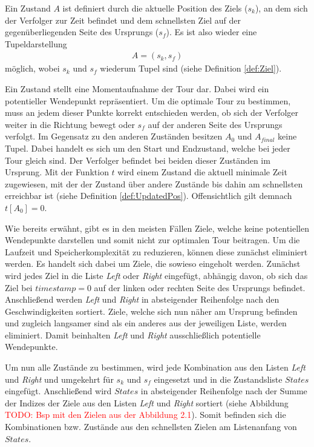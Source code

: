 \documentclass[german,version-2019-11]{uzl-thesis}
\begin{document}
\begin{definition}
Ein Zustand $A$ ist definiert durch die aktuelle Position des Ziels ($s_k$), an dem sich der Verfolger zur Zeit befindet und dem schnellsten Ziel auf der gegenüberliegenden Seite des Ursprungs ($s_f$). Es ist also wieder eine Tupeldarstellung
\begin{align*}
A = (s_k, s_f)
\end{align*}
möglich, wobei $s_k$ und $s_f$ wiederum Tupel sind (siehe Definition \ref{def:Ziel}). 
\end{definition}
Ein Zustand stellt eine Momentaufnahme der Tour dar. Dabei wird ein potentieller Wendepunkt repräsentiert. Um die optimale Tour zu bestimmen, muss an jedem dieser Punkte korrekt entschieden werden, ob sich der Verfolger weiter in die Richtung bewegt oder $s_f$ auf der anderen Seite des Ursprungs verfolgt. Im Gegensatz zu den anderen Zuständen besitzen $A_0$ und $A_{final}$ keine Tupel. Dabei handelt es sich um den Start und Endzustand, welche bei jeder Tour gleich sind. Der Verfolger befindet bei beiden dieser Zuständen im Ursprung. 
Mit der Funktion $t$ wird einem Zustand die aktuell minimale Zeit zugewiesen, mit der der Zustand über andere Zustände bis dahin am schnellsten erreichbar ist (siehe Definition \ref{def:UpdatedPos}). Offensichtlich gilt demnach $t[A_0] = 0$. 

Wie bereits erwähnt, gibt es in den meisten Fällen Ziele, welche keine potentiellen Wendepunkte darstellen und somit nicht zur optimalen Tour beitragen. Um die Laufzeit und Speicherkomplexität zu reduzieren, können diese zunächst eliminiert werden. Es handelt sich dabei um Ziele, die sowieso eingeholt werden. Zunächst wird jedes Ziel in die Liste \emph{Left} oder \emph{Right} eingefügt, abhängig davon, ob sich das Ziel bei $timestamp = 0$ auf der linken oder rechten Seite des Ursprungs befindet. Anschließend werden \emph{Left} und \emph{Right} in absteigender Reihenfolge nach den Geschwindigkeiten sortiert. Ziele, welche sich nun näher am Ursprung befinden
und zugleich langsamer sind als ein anderes aus der jeweiligen Liste, werden eliminiert. Damit beinhalten \emph{Left} und \emph{Right} ausschließlich potentielle Wendepunkte. 

Um nun alle Zustände zu bestimmen, wird jede Kombination aus den Listen \emph{Left} und \emph{Right} und umgekehrt für $s_k$ und $s_f$ eingesetzt und in die Zustandsliste $States$ eingefügt. Anschließend wird $States$ in absteigender Reihenfolge nach der Summe der Indizes der Ziele aus den Listen \emph{Left} und \emph{Right} sortiert (siehe Abbildung \textcolor{red}{TODO: Bsp mit den Zielen aus der Abbildung 2.1}). Somit befinden sich die Kombinationen bzw. Zustände aus den schnellsten Zielen am Listenanfang von $States$.
\end{document}
